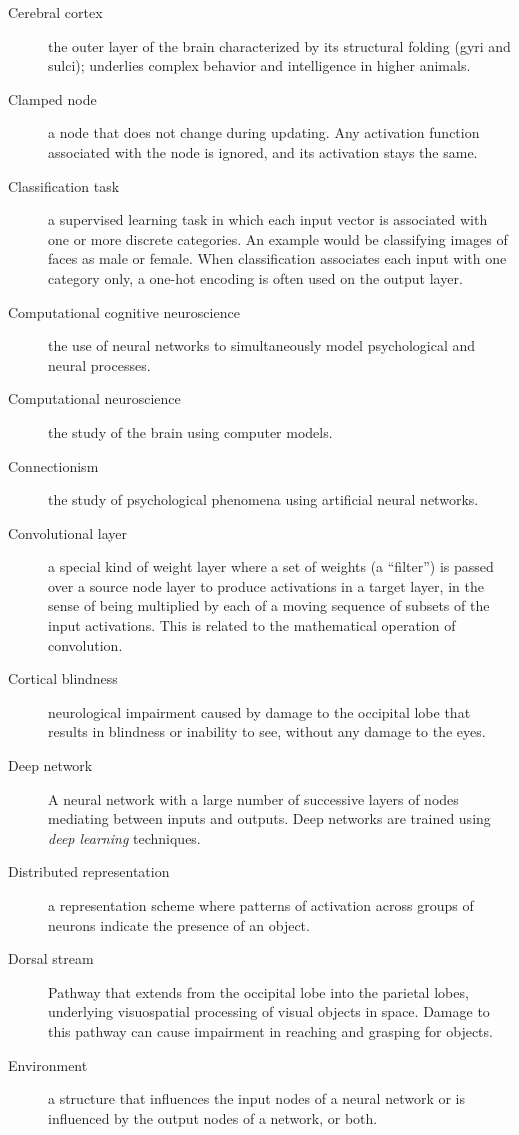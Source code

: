 \begin{description}
\item[Cerebral cortex] the outer layer of the brain characterized by its structural folding (gyri and sulci); underlies complex behavior and intelligence in higher animals. 
\item[Clamped node] a node that does not change during updating. Any activation function associated with the node is ignored, and its activation stays the same.
\item[Classification task] a supervised learning task in which each input vector is associated with one or more discrete  categories. An example would be classifying images of faces as male or female. When classification associates each input with one category only, a one-hot encoding is often used on the output layer.
\item[Computational cognitive neuroscience] the use of neural networks to simultaneously model psychological and neural processes.
\item[Computational neuroscience] the study of the brain using computer models.
\item[Connectionism] the study of psychological phenomena using artificial neural networks.
\item[Convolutional layer] a special kind of weight layer where a set of weights (a ``filter'') is passed over a source node layer to produce activations in a target layer, in the sense of being multiplied by each of a moving sequence of subsets of the input activations. This is related to the mathematical operation of convolution.
\item[Cortical blindness] neurological impairment caused by damage to the occipital lobe that results in blindness or inability to see, without any damage to the eyes. 
\item[Deep network] A neural network with a large number of successive layers of nodes mediating between inputs and outputs. Deep networks are trained using \emph{deep learning} techniques.
\item[Distributed representation] a representation scheme where patterns of activation across groups of neurons indicate the presence of an object. 
\item[Dorsal stream] Pathway that extends from the occipital lobe into the parietal lobes, underlying visuospatial processing of visual objects in space. Damage to this pathway can cause impairment in reaching and grasping for objects. 
\item[Environment] a structure that influences the input nodes of a neural network or is influenced by the output nodes of a network, or both.

\end{description}
